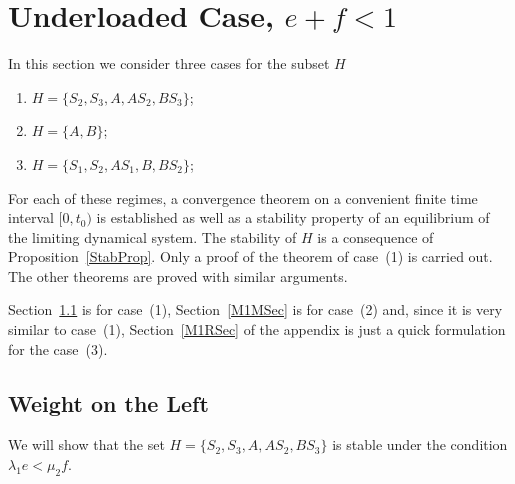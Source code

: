 \documentclass[english]{amsart}
\numberwithin{proposition}{section}
\begin{document}
\section{Underloaded Case, $e{+}f{<}1$}\label{M1Sec}
In this section we consider three cases for the subset $H$
\begin{enumerate}
\item $H{=}\{{ S}_2,{ S}_3, { A},  { AS_2}, { BS_3}\}$;
\item $H{=}\{{ A}, { B}\}$;
\item $H{=}\{{ S}_1, { S}_2,  { AS_1},{ B},  { BS_2}\}$;
\end{enumerate}
For each of these regimes, a convergence theorem on a convenient finite time interval $[0,t_0)$ is established as well as a stability property of an equilibrium of the limiting dynamical system. The stability of $H$ is a consequence of Proposition~\ref{StabProp}. Only a proof of the theorem of case~(1) is carried out. The other theorems are proved with similar arguments. 

Section~\ref{M1LSec} is for case~(1), Section~\ref{M1MSec} is for case~(2) and, since it is very similar to case~(1),  Section~\ref{M1RSec} of the appendix is just a quick formulation for the case~(3).

\subsection{Weight on the Left}\label{M1LSec}
We will show  that the set $H{=}\{{ S}_2,{ S}_3, { A},  { AS_2}, { BS_3}\}$ is stable under the condition $\lambda_1e{<}\mu_2 f$. 
\end{document}
